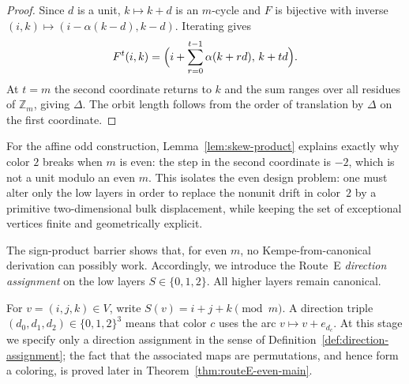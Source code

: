 \documentclass[11pt]{article}
\begin{document}
\begin{proof}
Since $d$ is a unit, $k\mapsto k+d$ is an $m$-cycle and $F$ is bijective with inverse $(i,k)\mapsto(i-\alpha(k-d),k-d)$.
Iterating gives
\[
F^t(i,k)=\Bigl(i+\sum_{r=0}^{t-1}\alpha(k+rd),\,k+td\Bigr).
\]
At $t=m$ the second coordinate returns to $k$ and the sum ranges over all residues of $\mathbb Z_m$, giving $\Delta$.
The orbit length follows from the order of translation by $\Delta$ on the first coordinate.
\end{proof}

For the affine odd construction, Lemma~\ref{lem:skew-product} explains exactly why color $2$ breaks when $m$ is even: the step in the second coordinate is $-2$, which is not a unit modulo an even $m$.
This isolates the even design problem: one must alter only the low layers in order to replace the nonunit drift in color~$2$ by a primitive two-dimensional bulk displacement, while keeping the set of exceptional vertices finite and geometrically explicit.

The sign-product barrier shows that, for even $m$, no Kempe-from-canonical derivation can possibly work.
Accordingly, we introduce the Route~E \emph{direction assignment} on the low layers $S\in\{0,1,2\}$.
All higher layers remain canonical.

For $v=(i,j,k)\in V$, write $S(v)=i+j+k\pmod m$.
A direction triple $(d_0,d_1,d_2)\in\{0,1,2\}^3$ means that color $c$ uses the arc $v\mapsto v+e_{d_c}$.
At this stage we specify only a direction assignment in the sense of Definition~\ref{def:direction-assignment}; the fact that the associated maps are permutations, and hence form a coloring, is proved later in Theorem~\ref{thm:routeE-even-main}.
\end{document}
